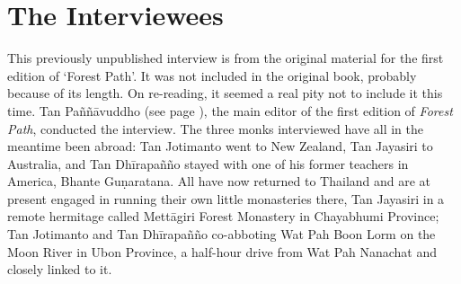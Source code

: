 \dividerRule

\section{The Interviewees}

This previously unpublished interview is from the original
material for the first edition of `Forest Path'. It was not included in
the original book, probably because of its length. On re-reading, it
seemed a real pity not to include it this time. Tan Paññāvuddho (see page \pageref{pannyavuddho-desc}),
the main editor of the first edition of \emph{Forest Path}, conducted the
interview. The three monks interviewed have all in the meantime been
abroad: Tan Jotimanto went to New Zealand, Tan Jayasiri to Australia, 
and Tan Dhīrapañño stayed with one of his former teachers in America, 
Bhante Guṇaratana. All have now returned to Thailand and are at present
engaged in running their own little monasteries there, Tan Jayasiri in a
remote hermitage called Mettāgiri Forest Monastery in Chayabhumi
Province; Tan Jotimanto and Tan Dhīrapañño co-abboting Wat Pah Boon Lorm
on the Moon River in Ubon Province, a half-hour drive from Wat Pah
Nanachat and closely linked to it.

